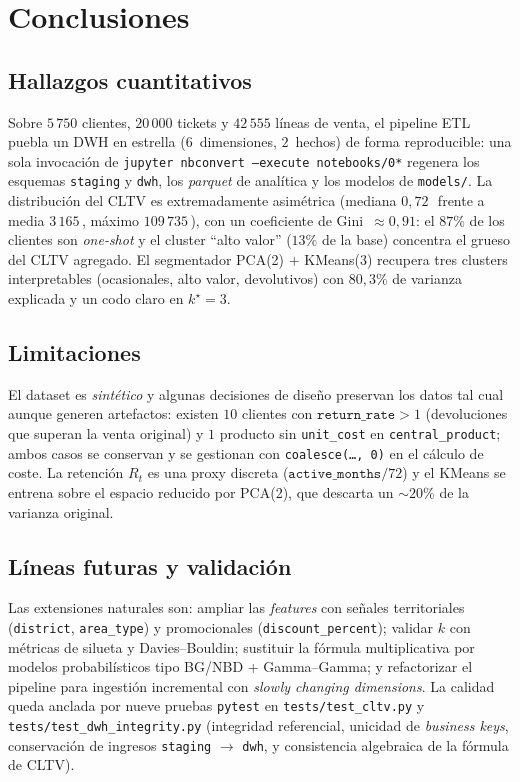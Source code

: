 \section{Conclusiones}
\label{sec:conclusiones}

\subsection*{Hallazgos cuantitativos}

Sobre $5\,750$ clientes, $20\,000$ tickets y $42\,555$ líneas de venta, el
pipeline ETL puebla un DWH en estrella ($6$~dimensiones, $2$~hechos) de
forma reproducible: una sola invocación de
\texttt{jupyter nbconvert --execute notebooks/0*} regenera los esquemas
\texttt{staging} y \texttt{dwh}, los \emph{parquet} de analítica y los
modelos de \texttt{models/}. La distribución del CLTV es extremadamente
asimétrica (mediana $0{,}72$\,\texteuro\ frente a media $3\,165$\,\texteuro,
máximo $109\,735$\,\texteuro), con un coeficiente de Gini~$\approx 0{,}91$:
el $87\%$ de los clientes son \emph{one-shot} y el cluster ``alto valor''
($13\%$ de la base) concentra el grueso del CLTV agregado. El segmentador
PCA(2) $+$ KMeans(3) recupera tres clusters interpretables (ocasionales,
alto valor, devolutivos) con $80{,}3\%$ de varianza explicada y un codo
claro en $k^{\star}=3$.

\subsection*{Limitaciones}

El dataset es \emph{sintético} y algunas decisiones de diseño preservan los
datos tal cual aunque generen artefactos: existen $10$ clientes con
$\texttt{return\_rate} > 1$ (devoluciones que superan la venta original) y
$1$ producto sin \texttt{unit\_cost} en \texttt{central\_product}; ambos
casos se conservan y se gestionan con \texttt{coalesce(\dots, 0)} en el
cálculo de coste. La retención $R_t$ es una proxy discreta
($\texttt{active\_months}/72$) y el KMeans se entrena sobre el espacio
reducido por PCA(2), que descarta un $\sim 20\%$ de la varianza original.

\subsection*{Líneas futuras y validación}

Las extensiones naturales son: ampliar las \emph{features} con señales
territoriales (\texttt{district}, \texttt{area\_type}) y promocionales
(\texttt{discount\_percent}); validar $k$ con métricas de silueta y
Davies--Bouldin; sustituir la fórmula multiplicativa por modelos
probabilísticos tipo BG/NBD + Gamma--Gamma; y refactorizar el pipeline
para ingestión incremental con \emph{slowly changing dimensions}. La
calidad queda anclada por nueve pruebas \texttt{pytest} en
\texttt{tests/test\_cltv.py} y \texttt{tests/test\_dwh\_integrity.py}
(integridad referencial, unicidad de \emph{business keys}, conservación de
ingresos \texttt{staging} $\to$ \texttt{dwh}, y consistencia algebraica de
la fórmula de CLTV).
